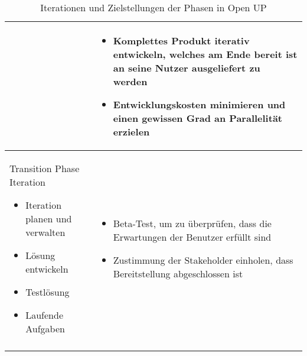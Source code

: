 \begin{longtable}{|p{6cm}|p{8cm}|}
\begin {itemize}
\end{itemize}

&
   \begin {itemize}
\item Komplettes Produkt iterativ entwickeln, welches am Ende bereit ist an seine Nutzer ausgeliefert zu werden
\item Entwicklungskosten minimieren und einen gewissen Grad an Parallelität erzielen 
\end{itemize}

 \\
\hline
Transition Phase Iteration 

   \begin {itemize}

 \item Iteration planen und verwalten
     \item Lösung entwickeln
   \item Testlösung
   \item Laufende Aufgaben

 \end{itemize}

 
  &
  
     \begin {itemize}
      \item Beta-Test, um zu überprüfen, dass die Erwartungen der Benutzer erfüllt sind 
     \item Zustimmung der Stakeholder einholen, dass Bereitstellung abgeschlossen ist
      \end{itemize}

\\

\hline

\caption{Iterationen und Zielstellungen der Phasen in Open UP \cite{eclipseopenup}}
\label{tab:tab1}
\end{longtable}






